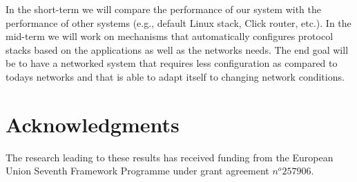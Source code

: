 \documentclass{sig-alternate}
\begin{document}
In the short-term we will compare the performance of our system with the performance of other systems (e.g., default Linux stack, Click router, etc.). 
In the mid-term we will work on mechanisms that automatically configures protocol stacks based on the applications as well as the networks needs. 
The end goal will be to have a networked system that requires less configuration as compared to todays networks and that is able to adapt itself to changing network conditions.   





\section{Acknowledgments}
The research leading to these results has received funding from the European Union Seventh Framework Programme under grant agreement $n^o 257906$.
%

%
%
\end{document}
